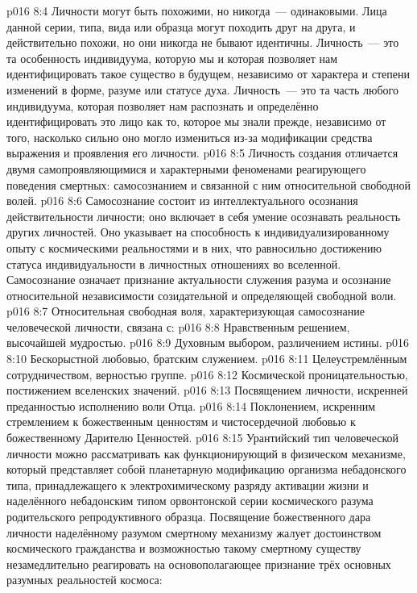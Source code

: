 \vs p016 8:4 Личности могут быть похожими, но никогда~--- одинаковыми. Лица данной серии, типа, вида или образца могут походить друг на друга, и действительно похожи, но они никогда не бывают идентичны. Личность~--- это та особенность индивидуума, которую мы  и которая позволяет нам идентифицировать такое существо в будущем, независимо от характера и степени изменений в форме, разуме или статусе духа. Личность~--- это та часть любого индивидуума, которая позволяет нам распознать и определённо идентифицировать это лицо как то, которое мы знали прежде, независимо от того, насколько сильно оно могло измениться из\hyp{}за модификации средства выражения и проявления его личности.
\vs p016 8:5 \pc Личность создания отличается двумя самопроявляющимися и характерными феноменами реагирующего поведения смертных: самосознанием и связанной с ним относительной свободной волей.
\vs p016 8:6 Самосознание состоит из интеллектуального осознания действительности личности; оно включает в себя умение осознавать реальность других личностей. Оно указывает на способность к индивидуализированному опыту с космическими реальностями и в них, что равносильно достижению статуса индивидуальности в личностных отношениях во вселенной. Самосознание означает признание актуальности служения разума и осознание относительной независимости созидательной и определяющей свободной воли.
\vs p016 8:7 \pc Относительная свободная воля, характеризующая самосознание человеческой личности, связана с:
\vs p016 8:8 Нравственным решением, высочайшей мудростью.
\vs p016 8:9 Духовным выбором, различением истины.
\vs p016 8:10 Бескорыстной любовью, братским служением.
\vs p016 8:11 Целеустремлённым сотрудничеством, верностью группе.
\vs p016 8:12 Космической проницательностью, постижением вселенских значений.
\vs p016 8:13 Посвящением личности, искренней преданностью исполнению воли Отца.
\vs p016 8:14 Поклонением, искренним стремлением к божественным ценностям и чистосердечной любовью к божественному Дарителю Ценностей.
\vs p016 8:15 \pc Урантийский тип человеческой личности можно рассматривать как функционирующий в физическом механизме, который представляет собой планетарную модификацию организма небадонского типа, принадлежащего к электрохимическому разряду активации жизни и наделённого небадонским типом орвонтонской серии космического разума родительского репродуктивного образца. Посвящение божественного дара личности наделённому разумом смертному механизму жалует достоинством космического гражданства и возможностью такому смертному существу незамедлительно реагировать на основополагающее признание трёх основных разумных реальностей космоса:
